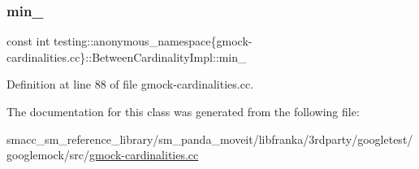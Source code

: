 \subsubsection{\texorpdfstring{min\+\_\+}{min\_}}
{\footnotesize\ttfamily const int testing\+::anonymous\+\_\+namespace\{gmock-\/cardinalities.\+cc\}\+::Between\+Cardinality\+Impl\+::min\+\_\+\hspace{0.3cm}{\ttfamily [private]}}



Definition at line 88 of file gmock-\/cardinalities.\+cc.



The documentation for this class was generated from the following file\+:\begin{DoxyCompactItemize}
\item 
smacc\+\_\+sm\+\_\+reference\+\_\+library/sm\+\_\+panda\+\_\+moveit/libfranka/3rdparty/googletest/googlemock/src/\hyperlink{gmock-cardinalities_8cc}{gmock-\/cardinalities.\+cc}\end{DoxyCompactItemize}
